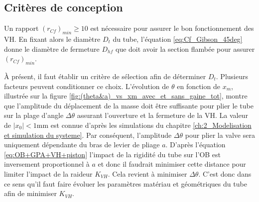     \subsection{Critères de conception}
    \label{subsec:5.1.3 - Criteres de conception}
Un rapport $(r_{Cf})_{min} \ge 10$ est nécessaire pour assurer le bon fonctionnement des VH. En fixant alors le diamètre $D_t$ du tube, l'équation \ref{eq:Cf_Gibson_45deg} donne le diamètre de fermeture $D_{hf}$ que doit avoir la section flambée pour assurer $(r_{Cf})_{min}$.

À présent, il faut établir un critère de sélection afin de déterminer $D_t$. Plusieurs facteurs peuvent conditionner ce choix. L'évolution de $\theta$ en fonction de $x_m$, illustrée sur la figure \ref{fig:(theta&a)_vs_xm_avec_et_sans_gaine_tot}, montre que l'amplitude du déplacement de la masse doit être suffisante pour plier le tube sur la plage d'angle $\Delta\theta$ assurant l'ouverture et la fermeture de la VH. La valeur de $|x_0|<1$mm est connue d'après les simulations du chapitre \ref{ch:2_Modelisation et simulation du systeme}. Par conséquent, l'amplitude $\Delta \theta$ pour plier la valve sera uniquement dépendante du bras de levier de pliage $a$. D'après l'équation \ref{eq:OB+GPA+VH+piston} l'impact de la rigidité du tube sur l'OB est inversement proportionnel à $a$ et donc il faudrait minimiser cette distance pour limiter l'impact de la raideur $K_{VH}$. Cela revient à minimiser $\Delta \theta$. C'est donc dans ce sens qu'il faut faire évoluer les paramètres matériau et géométriques du tube afin de minimiser $K_{VH}$.

